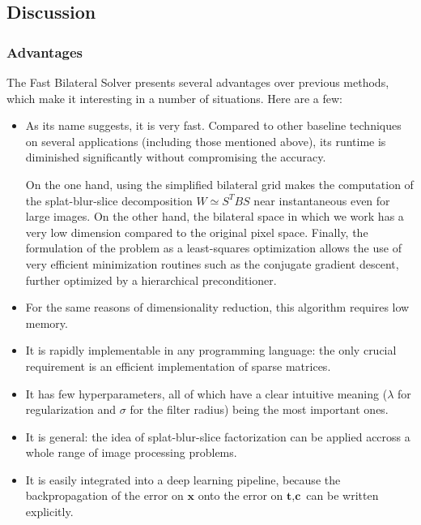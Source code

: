 \documentclass{article}
\begin{document}
\subsection{Discussion}

\subsubsection{Advantages}

The Fast Bilateral Solver presents several advantages over previous methods, which make it interesting in a number of situations. Here are a few:

\begin{itemize}
    \item As its name suggests, it is very fast. Compared to other baseline techniques on several applications (including those mentioned above), its runtime is diminished significantly without compromising the accuracy.
    
    On the one hand, using the simplified bilateral grid makes the computation of the splat-blur-slice decomposition $W \simeq S^T B S$ near instantaneous even for large images. On the other hand, the bilateral space in which we work has a very low dimension compared to the original pixel space. Finally, the formulation of the problem as a least-squares optimization allows the use of very efficient minimization routines such as the conjugate gradient descent, further optimized by a hierarchical preconditioner.
    
    \item For the same reasons of dimensionality reduction, this algorithm requires low memory.
    
    \item It is rapidly implementable in any programming language: the only crucial requirement is an efficient implementation of sparse matrices.
    
    \item It has few hyperparameters, all of which have a clear intuitive meaning ($\lambda$ for regularization and $\sigma$ for the filter radius) being the most important ones.
    
    \item It is general: the idea of splat-blur-slice factorization can be applied accross a whole range of image processing problems.
    
    \item It is easily integrated into a deep learning pipeline, because the backpropagation of the error on $\textbf{x}$ onto the error on $\textbf{t}, \textbf{c}$ can be written explicitly.
    
\end{itemize}
\end{document}
